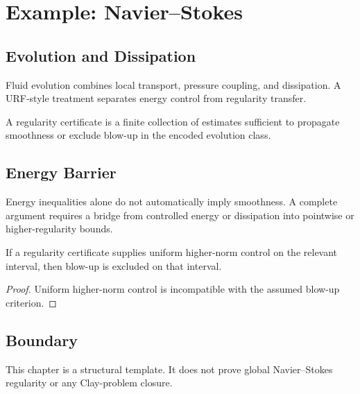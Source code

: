 \chapter{Example: Navier--Stokes}

\section{Evolution and Dissipation}

Fluid evolution combines local transport, pressure coupling, and dissipation.  A URF-style treatment separates energy control from regularity transfer.

\begin{definition}
A regularity certificate is a finite collection of estimates sufficient to propagate smoothness or exclude blow-up in the encoded evolution class.
\end{definition}

\section{Energy Barrier}

Energy inequalities alone do not automatically imply smoothness.  A complete argument requires a bridge from controlled energy or dissipation into pointwise or higher-regularity bounds.

\begin{lemma}
If a regularity certificate supplies uniform higher-norm control on the relevant interval, then blow-up is excluded on that interval.
\end{lemma}

\begin{proof}
Uniform higher-norm control is incompatible with the assumed blow-up criterion.
\end{proof}

\section{Boundary}

This chapter is a structural template.  It does not prove global Navier--Stokes regularity or any Clay-problem closure.
